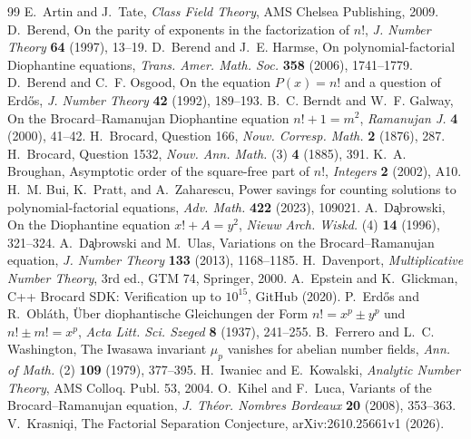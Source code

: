 \documentclass[11pt,reqno]{amsart}
\theoremstyle{remark}
\begin{document}
\begin{thebibliography}{99}
 E.~Artin and J.~Tate, \emph{Class Field Theory}, AMS Chelsea Publishing, 2009.
 D.~Berend, On the parity of exponents in the factorization of $n!$, \emph{J. Number Theory} \textbf{64} (1997), 13--19.
 D.~Berend and J.~E. Harmse, On polynomial-factorial Diophantine equations, \emph{Trans. Amer. Math. Soc.} \textbf{358} (2006), 1741--1779.
 D.~Berend and C.~F. Osgood, On the equation $P(x) = n!$ and a question of Erd\H{o}s, \emph{J. Number Theory} \textbf{42} (1992), 189--193.
 B.~C. Berndt and W.~F. Galway, On the Brocard--Ramanujan Diophantine equation $n!+1=m^2$, \emph{Ramanujan J.} \textbf{4} (2000), 41--42.
 H.~Brocard, Question 166, \emph{Nouv. Corresp. Math.} \textbf{2} (1876), 287.
 H.~Brocard, Question 1532, \emph{Nouv. Ann. Math.} (3) \textbf{4} (1885), 391.
 K.~A. Broughan, Asymptotic order of the square-free part of $n!$, \emph{Integers} \textbf{2} (2002), A10.
 H.~M. Bui, K.~Pratt, and A.~Zaharescu, Power savings for counting solutions to polynomial-factorial equations, \emph{Adv. Math.} \textbf{422} (2023), 109021.
 A.~D\c{a}browski, On the Diophantine equation $x! + A = y^2$, \emph{Nieuw Arch. Wiskd.} (4) \textbf{14} (1996), 321--324.
 A.~D\c{a}browski and M.~Ulas, Variations on the Brocard--Ramanujan equation, \emph{J. Number Theory} \textbf{133} (2013), 1168--1185.
 H.~Davenport, \emph{Multiplicative Number Theory}, 3rd ed., GTM 74, Springer, 2000.
 A.~Epstein and K.~Glickman, C++ Brocard SDK: Verification up to $10^{15}$, GitHub (2020).
 P.~Erd\H{o}s and R.~Obl\'ath, \"Uber diophantische Gleichungen der Form $n! = x^p \pm y^p$ und $n! \pm m! = x^p$, \emph{Acta Litt. Sci. Szeged} \textbf{8} (1937), 241--255.
 B.~Ferrero and L.~C. Washington, The Iwasawa invariant $\mu_p$ vanishes for abelian number fields, \emph{Ann. of Math.} (2) \textbf{109} (1979), 377--395.
 H.~Iwaniec and E.~Kowalski, \emph{Analytic Number Theory}, AMS Colloq. Publ. 53, 2004.
 O.~Kihel and F.~Luca, Variants of the Brocard--Ramanujan equation, \emph{J. Th\'eor. Nombres Bordeaux} \textbf{20} (2008), 353--363.
 V.~Krasniqi, The Factorial Separation Conjecture, arXiv:2610.25661v1 (2026).

\end{thebibliography}
\end{document}
